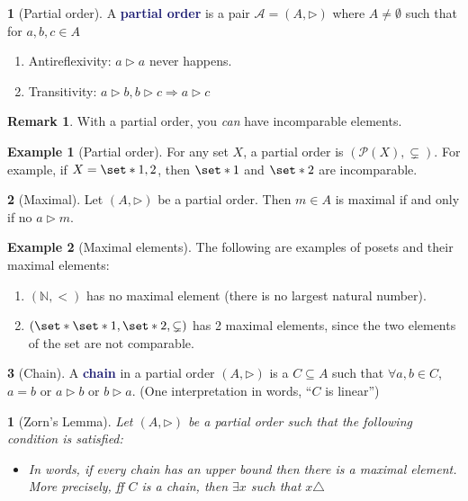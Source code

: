 \documentclass[11pt]{article}
\numberwithin{equation}{section}
\newcommand{\navy}[1]{\textcolor{MidnightBlue}{\bf #1}}
\theoremstyle{plain}
\newtheorem{theorem}{\color{ForestGreen}{\textbf{Theorem}}}[section]
\theoremstyle{definition}
\newtheorem{definition}{\color{MidnightBlue}{\textbf{Definition}}}[section]
\newtheorem{example}{\color{WildStrawberry}Example}[section]
\newtheorem*{remark}{Remark}
\def\Set{\set*}%
\def\imp{\Rightarrow}
\newcommand{\1}{\mathbbm 1}
\newcommand{\NN}{\mathbb N}
\newcommand{\pP}{\mathcal P}
\newcommand{\aAA}{\mathcal A}
\newcommand{\zZ}{\mathcal Z}
\begin{document}
\begin{definition}[Partial order]
	A \navy{partial order} is a pair $\aAA = (A, \triangleright)$ where $A \neq \emptyset$ such that  for $a,b,c \in A$
	\begin{enumerate}
		\item Antireflexivity: $a \triangleright a$ never happens.
		\item Transitivity: $a \triangleright b, b \triangleright c \imp a \triangleright c$ 
	\end{enumerate}
\end{definition}
\begin{remark}
	With a partial order, you \emph{can} have incomparable elements. 
\end{remark}

\begin{example}[Partial order]
	For any set $X$, a partial order is $(\pP(X), \subsetneq)$. For example, if $X=\Set{1,2}$, then $\Set{1}$ and $\Set{2}$ are incomparable. 
\end{example}

\begin{definition}[Maximal]
	Let $(A, \triangleright)$ be a partial order. Then $m \in A$ is maximal if and only if no $a \triangleright m$. 
\end{definition}

\begin{example}[Maximal elements]
	The following are examples of posets and their maximal elements: 
	\begin{enumerate}
		\item $(\NN, <)$ has no maximal element (there is no largest natural number).
		\item $(\Set{\Set{1},\Set{2}}, \subsetneq)$ has 2 maximal elements, since the two elements of the set are not comparable. 
	\end{enumerate}
\end{example}

\begin{definition}[Chain]
	A \navy{chain} in a partial order $(A, \triangleright)$ is a $C \subseteq A$ such that $\forall a,b \in C$, $a=b$ or $a \triangleright b$ or $b \triangleright a$. (One interpretation in words, ``$C$ is linear'') 
\end{definition}

\begin{theorem}[Zorn's Lemma]
	Let $(A, \triangleright)$ be a partial order such that the following condition is satisfied:
	\begin{itemize}
		\item[($\zZ$)] In words, if every chain has an upper bound then there is a maximal element. More precisely, ff $C$ is a chain, then $\exists x$ such that $x \triangle$
	\end{itemize}
\end{theorem}
\end{document}
